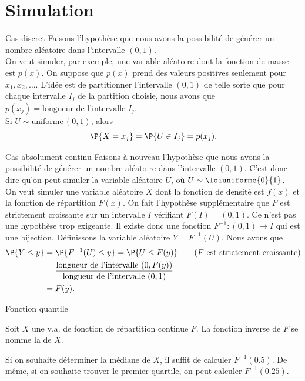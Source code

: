 \documentclass[nuit,charter,pied]{BeamerJS}
\begin{document}
\section{Simulation}
\begin{frame}{Cas discret}
	Faisons l'hypothèse que nous avons la possibilité de générer un nombre aléatoire dans l'intervalle $(0,1)$.\\

	On veut simuler, par exemple, une variable aléatoire dont la fonction de masse est $p(x)$. On suppose que $p(x)$ prend des valeurs positives seulement pour $x_1,x_2,\ldots$. L'idée est de partitionner l'intervalle $(0,1)$ de telle sorte que pour chaque intervalle $I_j$ de la partition choisie, nous avons que $p(x_j)=\text{longueur de l'intervalle~}I_j$.\\

	Si $U\sim\text{uniforme}\,(0,1)$, alors
	\[\P{X=x_j}=\P{U\in I_j}=p(x_j).\]
\end{frame}
\begin{frame}{Cas absolument continu}
	\small
	Faisons à nouveau l'hypothèse que nous avons la possibilité de générer un nombre aléatoire dans l'intervalle $(0,1)$. C'est donc dire qu'on peut simuler la variable aléatoire $U$, où  $U\sim\loiuniforme{0}{1}$.\\

	On veut simuler une variable aléatoire $X$ dont la fonction de densité est $f(x)$ et la fonction de répartition $F(x)$. On fait l'hypothèse supplémentaire que $F$ est strictement croissante sur un intervalle $I$ vérifiant $F(I)=(0,1)$. Ce n'est pas une hypothèse trop exigeante. Il existe donc une fonction $F^{-1}:(0,1)\rightarrow I$ qui est une bijection. Définissons la variable aléatoire $Y=F^{-1}(U)$. Nous avons que
	\begin{align*}
		\P{Y\leq y}&=\P{F^{-1}(U)\leq y}=\P{U\leq F(y)}\qquad (F \text{~est strictement croissante)}\\
		&=\frac{\text{longueur de l'intervalle~}(0,F(y))}{\text{longueur de l'intervalle~}(0,1)}\\
		&=F(y).
	\end{align*}
\end{frame}
\begin{frame}[t]{Fonction quantile}
	\begin{defn}{}
		Soit $X$ une v.a. de fonction de répartition continue $F$. La fonction inverse de $F$ se nomme la  de $X$.
	\end{defn}
	Si on souhaite déterminer la médiane de $X$, il suffit de calculer $F^{-1}(\num{0,5})$. De même, si on souhaite trouver le premier quartile, on peut calculer $F^{-1}(\num{0,25})$.
\end{frame}
\end{document}
